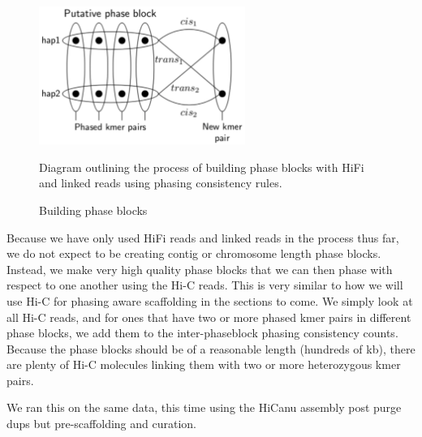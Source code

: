 {\begin{figure}[htbp!]
\caption{Building phase blocks}
\label{figure:phaseblocks}
\begin{centering}
\includegraphics[width=0.6\textwidth]{phaseblockbuilding.png}
\par{Diagram outlining the process of building phase blocks with HiFi and linked reads using phasing consistency rules. }
\end{centering}
\end{figure}

\par{
Because we have only used HiFi reads and linked reads in the process thus far, we do not expect to be creating contig or chromosome length phase blocks. Instead, we make very high quality phase blocks that we can then phase with respect to one another using the Hi-C reads. This is very similar to how we will use Hi-C for phasing aware scaffolding in the sections to come. We simply look at all Hi-C reads, and for ones that have two or more phased kmer pairs in different phase blocks, we add them to the inter-phaseblock phasing consistency counts. Because the phase blocks should be of a reasonable length (hundreds of kb), there are plenty of Hi-C molecules linking them with two or more heterozygous kmer pairs.
}

\par{
We ran this on the same data, this time using the HiCanu assembly post purge dups but pre-scaffolding and curation.
}


}

